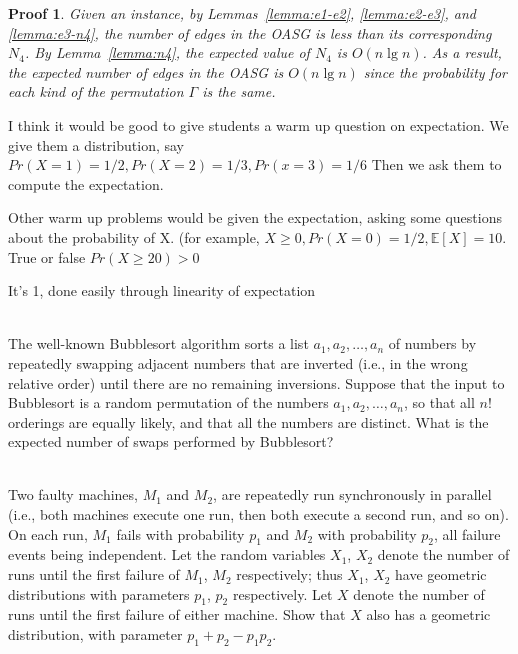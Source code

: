 \documentclass[]{article}
\newtheorem{Proof}{Proof}
\begin{document}
\begin{qunlist}
{{\begin{Proof}
Given an instance, by Lemmas~\ref{lemma:e1-e2}, \ref{lemma:e2-e3}, and \ref{lemma:e3-n4}, the number of edges in the OASG is less than its corresponding $N_4$. By Lemma~\ref{lemma:n4}, the expected value of $N_4$ is $O(n\lg n)$. As a result, the expected number of edges in the OASG is $O(n\lg n)$ since the probability for each kind of the permutation $\Gamma$ is the same.
\end{Proof}
}} \fi



 
 I think it would be good to give students a warm up question on expectation. We give them a distribution, say $Pr(X = 1) = 1/2, Pr (X=2) = 1/3, Pr (x=3) = 1/6$ Then we ask them to compute the expectation.
 
 Other warm up problems would be given the expectation, asking some questions about the probability of X. (for example, $X\geq 0, Pr(X=0) = 1/2, \mathbb{E}[X] = 10.$ True or false $Pr(X \geq 20) > 0$



It's 1, done easily through linearity of expectation


 \\
The well-known Bubblesort algorithm sorts a list $a_1, a_2, \ldots, a_n$ of numbers by repeatedly swapping adjacent numbers that are inverted (i.e., in the wrong relative order) until there are no remaining inversions. Suppose that the input to Bubblesort is a random permutation of the numbers $a_1, a_2, \ldots, a_n$, so that all $n!$ orderings are equally likely, and that all the numbers are distinct. What is the expected number of swaps performed by Bubblesort?

 \\
Two faulty machines, $M_1$ and $M_2$, are repeatedly run synchronously in parallel (i.e., both machines execute one run, then both execute a second run, and so on). On each run, $M_1$ fails with probability $p_1$ and $M_2$ with probability $p_2$, all failure events being independent. Let the random variables $X_1$, $X_2$ denote the number of runs until the first failure of $M_1$, $M_2$ respectively; thus $X_1$, $X_2$ have geometric distributions with parameters $p_1$, $p_2$ respectively.
Let $X$ denote the number of runs until the first failure of either machine. Show that $X$ also has a geometric distribution, with parameter $p_1 + p_2 − p_1p_2.$



\end{qunlist}
\end{document}
